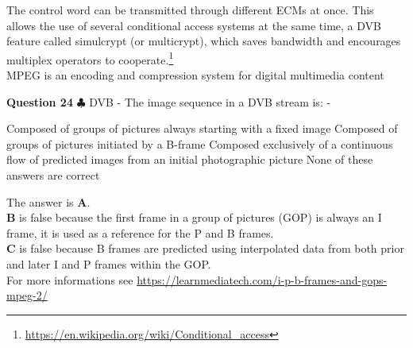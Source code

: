 \documentclass[en]{sourcefiles/eplexam}
\newcounter{choice}
\renewcommand\thechoice{\textbf{\Alph{choice}}}
\newcommand\choicelabel{\thechoice$\quad$}
\newenvironment{choices}%
  {\list{\choicelabel}%
     {\usecounter{choice}\def\makelabel##1{\hss\llap{##1}}%
       \settowidth{\leftmargin}{W.\hskip\labelsep\hskip 2.5em}%
       \def\choice{%
         \item
       } %
       \labelwidth\leftmargin\advance\labelwidth-\labelsep
       \topsep=0pt
       \partopsep=0pt
     }%
  }%
  {\endlist}
\begin{document}
\begin{solution}
\noindent The control word can be transmitted through different ECMs at once. This allows the use of several conditional access systems at the same time, a DVB feature called simulcrypt (or multicrypt), which saves bandwidth and encourages multiplex operators to cooperate.\footnote{\url{https://en.wikipedia.org/wiki/Conditional_access}}\\

\noindent MPEG is an encoding and compression system for digital multimedia content

\end{solution}





\textbf{Question 24} $\clubsuit$ DVB - The image sequence in a DVB stream is:
\begin{choices}
    \choice Composed of groups of pictures always starting with a fixed image
    \choice Composed of groups of pictures initiated by a B-frame
    \choice Composed exclusively of a continuous flow of predicted images from an initial photographic picture
     \choice None of these answers are correct
\end{choices}
\begin{solution}
The answer is \textbf{A}.\\
\textbf{B} is false because the first frame in a group of pictures (GOP) is always an I frame, it is used as a reference for the P and B frames.\\
\textbf{C} is false because B frames are predicted using interpolated data from both prior and later I and P frames within the GOP.\\
For more informations see \url{https://learnmediatech.com/i-p-b-frames-and-gops-mpeg-2/}

\end{solution}
\end{document}
